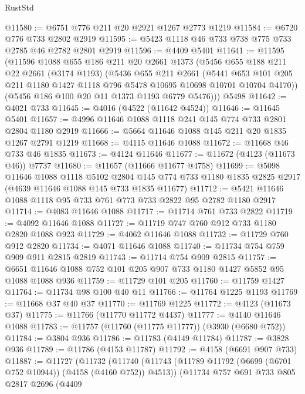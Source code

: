 \begin{lexlean}{RustStd}
\begin{coremodule}
@11580 := @6751 @776 @211 @20 @2921 @1267 @2773 @1219
@11584 := @6720 @776 @733 @2802 @2919
@11595 := @5423 @1118 @46 @733 @738 @775 @733 @2785 @46 @2782 @2801 @2919
@11596 := @4409 @5401
@11641 := @11595
    (@11596
      @1088
      @655
      @186
      @211
      @20
      @2661
      @1373
      (@5456
        @655
        @188
        @211
        @22
        @2661
        (@3174 @1193)
        (@5436
          @655
          @211
          @2661
          (@5441
            @653
            @101
            @205
            @211
            @1180
            @1427
            @1118
            @796
            @5478
            @10695
            @10698
            @10701
            @10704
            @4170))
        (@5456 @186 @100 @20 @11 @1373 @1193 @6779 @5476)))
    @5498
@11642 := @4021 @733
@11645 := @4016 (@4522 (@11642 @4524))
@11646 := @11645 @5401
@11657 := @4996 @11646 @1088 @1118 @241 @145 @774 @733 @2801 @2804 @1180 @2919
@11666 := @5664 @11646 @1088 @145 @211 @20 @1835 @1267 @2791 @1219
@11668 := @4115 @11646 @1088
@11672 := @11668 @46 @733 @46 @1835
@11673 := @4124 @11646
@11677 := @11672 (@4123 (@11673 @46)) @7737
@11680 := @11657 (@11666 @11677 @4758)
@11699 := @5098
    @11646
    @1088
    @1118
    @5102
    @2804
    @145
    @774
    @733
    @1180
    @1835
    @2825
    @2917
    (@4639 @11646 @1088 @145 @733 @1835 @11677)
@11712 := @5421 @11646 @1088 @1118 @95 @733 @761 @773 @733 @2822 @95 @2782 @1180 @2917
@11714 := @4083 @11646 @1088
@11717 := @11714 @761 @733 @2822
@11719 := @4092 @11646 @1088
@11727 := @11719 @747 @760 @912 @733 @1180 @2820 @1088 @923
@11729 := @4062 @11646 @1088
@11732 := @11729 @760 @912 @2820
@11734 := @4071 @11646 @1088
@11740 := @11734 @754 @759 @909 @911 @2815 @2819
@11743 := @11714 @754 @909 @2815
@11757 := @6651 @11646 @1088 @752 @101 @205 @907 @733 @1180 @1427 @5852 @95 @1088 @1088 @936
@11759 := @11729 @101 @205
@11760 := @11759 @1427
@11764 := @11734 @98 @100 @40 @11
@11766 := @11764 @1225 @1193
@11769 := @11668 @37 @40 @37
@11770 := @11769 @1225
@11772 := @4123 (@11673 @37)
@11775 := @11766 (@11770 @11772 @4437)
@11777 := @4140 @11646 @1088
@11783 := @11757 (@11760 (@11775 @11777)) (@3930 (@6680 @752))
@11784 := @3804 @936
@11786 := @11783 (@4149 @11784)
@11787 := @3828 @936
@11789 := @11786 (@4153 @11787)
@11792 := @4158 (@6691 @907 @733)
@11887 := @11727
    (@11732
      (@11740
        (@11743 (@11789 @11792 (@6699 (@6701 @752 @10944)) (@4158 (@4160 @752)) @4513))
        (@11734
          @757
          @691
          @733
          @805
          @2817
          @2696
          (@4409

\end{coremodule}
\end{lexlean}
